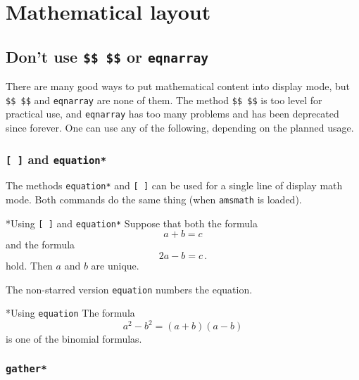 \chapter{Mathematical layout}





\section{Don’t use \texttt{\$\$  \$\$} or \texttt{eqnarray}}

There are many good ways to put mathematical content into display mode, but \texttt{\$\$  \$\$} and \texttt{eqnarray} are none of them.
The method \texttt{\$\$  \$\$} is too level for practical use, and \texttt{eqnarray} has too many problems and has been deprecated since forever.
One can use any of the following, depending on the planned usage.



\subsection{\texttt{{\tbs}[ {\tbs}]} and \texttt{equation*}}

The methods \texttt{equation*} and \texttt{{\tbs}[ {\tbs}]} can be used for a single line of display math mode.
Both commands do the same thing (when \texttt{amsmath} is loaded).
\begin{showlatex}*{Using \texttt{{\tbs}[ {\tbs}]} and \texttt{equation*}}
Suppose that both the formula
\[
  a + b = c
\]
and the formula
\begin{equation*}
  2a - b = c \,.
\end{equation*}
hold.
Then $a$ and $b$ are unique.
\end{showlatex}
The non-starred version \texttt{equation} numbers the equation.
\begin{showlatex}*{Using \texttt{equation}}
The formula
\begin{equation}
  a^2 - b^2 = (a + b)(a - b)
\end{equation}
is one of the binomial formulas.
\end{showlatex}



\subsection{\texttt{gather*}}

